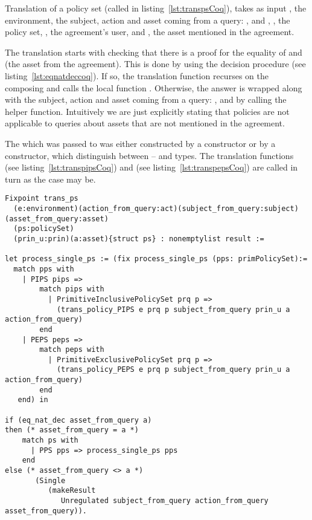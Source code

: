 Translation of a policy set (called  in listing~\ref{lst:transpsCoq}), takes as input , the environment, the subject, action and asset coming from a query: ,  and , , the policy set, , the agreement's user, and , the asset mentioned in the agreement. 

The translation starts with checking that there is a proof for the equality of  and  (the asset from the agreement). This is done by using the decision procedure  (see listing~\ref{lst:eqnatdeccoq}). If so, the translation function recurses on the composing  and calls the local function . Otherwise, the  answer is wrapped along with the subject, action and asset coming from a query: ,  and  by calling the  helper function. Intuitively we are just explicitly stating that policies are not applicable to queries about assets that are not mentioned in the agreement. 

The  which was passed to  was either constructed by a  constructor or by a  constructor, which distinguish between -- and  types. The translation functions  (see listing~\ref{lst:transpipsCoq}) and  (see listing~\ref{lst:transpepsCoq}) are called in turn as the case may be.


\begin{minipage}[c]{0.95\textwidth}
\begin{lstlisting}
Fixpoint trans_ps
  (e:environment)(action_from_query:act)(subject_from_query:subject)(asset_from_query:asset)
  (ps:policySet)
  (prin_u:prin)(a:asset){struct ps} : nonemptylist result :=

let process_single_ps := (fix process_single_ps (pps: primPolicySet):= 
  match pps with 
    | PIPS pips => 
        match pips with 
          | PrimitiveInclusivePolicySet prq p => 
            (trans_policy_PIPS e prq p subject_from_query prin_u a action_from_query)                
        end
    | PEPS peps => 
        match peps with 
          | PrimitiveExclusivePolicySet prq p => 
            (trans_policy_PEPS e prq p subject_from_query prin_u a action_from_query)
        end  
   end) in

if (eq_nat_dec asset_from_query a)
then (* asset_from_query = a *)  
    match ps with
      | PPS pps => process_single_ps pps
    end
else (* asset_from_query <> a *)
       (Single 
          (makeResult 
             Unregulated subject_from_query action_from_query asset_from_query)).
\end{lstlisting}
\end{minipage}


